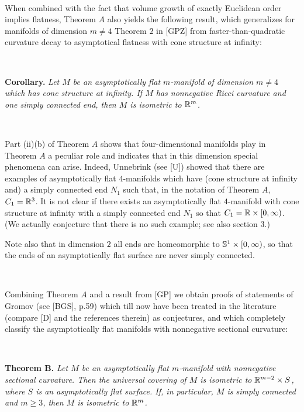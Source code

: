 \

When combined with the fact
that volume growth of exactly Euclidean order implies flatness,
Theorem $A$ also yields the following result,
which generalizes for manifolds of dimension $m\ne 4$ 
Theorem $2$ in [GPZ]
from faster-than-quadratic curvature decay to
asymptotical flatness with cone structure at infinity:

\  
 
 
\noindent 
{\bf Corollary.\ts}
{\sl
Let $M$ be an asymptotically flat $m$-manifold of dimension $m\ne 4$
which has cone structure at infinity.
If $M$ has nonnegative Ricci curvature and one simply connected end,
then $M$ is isometric to ${\Bbb R}^m$.
}


\

Part (ii)(b) of Theorem $A$ shows that 
four-dimensional manifolds play in Theorem $A$ a peculiar role
and indicates that in this dimension special phenomena can arise.
Indeed, Unnebrink (see [U]) showed that there are
examples of asymptotically flat $4$-manifolds
which have (cone structure at infinity and)  
a simply connected end $N_1$ 
such that, in the notation of Theorem $A$,  $C_1={\Bbb R}^3$.
It is not clear if there exists
an asymptotically flat $4$-manifold 
with cone structure at infinity
with a simply connected end $N_1$ so that $C_1={\Bbb R}\times [0,\infty)$.
(We actually conjecture that there is no such example;
see also section $3$.)


Note also that in dimension $2$ all ends are homeomorphic 
to ${\Bbb S}^1\times [0,\infty)$, so
that the
ends of an asymptotically flat surface are never simply connected.

\

 
Combining Theorem $A$ and a result from [GP]
we obtain
proofs of statements of Gromov (see [BGS], p.59)
which till now have been treated in the literature 
(compare [D] and the references therein)
as conjectures,
and which completely classify 
the asymptotically flat manifolds  
with nonnegative sectional curvature:




 
\  
 
\noindent 
{\bf Theorem B.\ts}
{\sl  
Let $M$ be an asymptotically flat $m$-manifold with nonnegative sectional 
curvature.
Then the universal covering of $M$ is isometric to ${\Bbb R}^{m-2}\times S$,  
where $S$ is an asymptotically flat surface. 
If, in particular, $M$ is simply connected and $m\ge 3$, 
then $M$ is isometric to ${\Bbb R}^m$.
}

\ 


